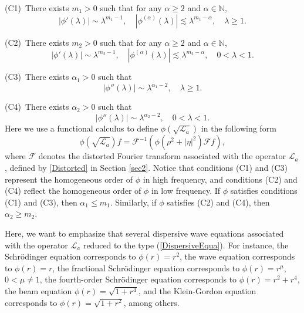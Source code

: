 \documentclass[a4paper,11pt, reqno]{amsart}
\numberwithin{equation}{section}
\theoremstyle{plain}
\theoremstyle{definition}
\theoremstyle{remark}
\begin{document}
(C1)~There exists $m_1>0$ such that for any $\alpha \geqslant 2$ and $\alpha \in \mathbb{N}$,
\begin{equation*}
|\phi'(\lambda)| \sim \lambda^{m_1-1}  , \quad |\phi^{(\alpha)}(\lambda)| \lesssim \lambda^{m_1-\alpha},\quad \lambda \geqslant 1.
\end{equation*}

(C2)~There exists $m_2>0$ such that for any $\alpha \geqslant 2$ and $\alpha \in \mathbb{N}$,
\begin{equation*}
|\phi'(\lambda)| \sim \lambda^{m_2-1}  , \quad |\phi^{(\alpha)}(\lambda)| \lesssim \lambda^{m_2-\alpha},\quad 0<\lambda<1.
\end{equation*}

(C3)~There exists $\alpha_1>0$ such that
\begin{equation*}
|\phi''(\lambda)| \sim \lambda^{\alpha_1-2}, \quad \lambda \geqslant1.
\end{equation*}

(C4)~There exists $\alpha_2>0$ such that
\begin{equation*}
|\phi''(\lambda)| \sim \lambda^{\alpha_2-2}, \quad  0<\lambda<1.
\end{equation*}
Here we use a functional calculus to define $\phi(\sqrt{\mathcal{L}_a}) $ in the following form $$\phi(\sqrt{\mathcal{L}_a})f=\mathcal{F}^{-1}\left(\phi(\rho^2+|\eta|^2) \mathcal{F} f\right), $$
where $\mathcal{F}$ denotes the distorted Fourier transform associated with the operator $\mathcal{L}_a$, defined by \eqref{Distorted} in Section \ref{sec2}.  Notice that conditions (C1) and (C3) represent the homogeneous order of $\phi$ in high frequency, and conditions (C2) and (C4) reflect the homogeneous order of $\phi$ in low frequency. If $\phi$ satisfies conditions (C1) and (C3), then $\alpha_1\leq m_1$. Similarly, if $\phi$ satisfies (C2) and (C4), then $\alpha_2\geq m_2$.

Here, we want to emphasize that several dispersive wave equations associated with the operator $\mathcal{L}_a$ reduced to the type (\ref{DispersiveEqua}). 
For instance, the Schr\"{o}dinger equation corresponds to $\phi(r)=r^2$, the wave equation corresponds to $\phi(r)=r$, the fractional Schr\"{o}dinger equation corresponds to $\phi(r)=r^\mu$, $0<\mu\neq 1$, the fourth-order Schr\"{o}dinger equation corresponds to $\phi(r)=r^2+r^4$, the beam equation $\phi(r)=\sqrt{1+r^4}$, and the Klein-Gordon equation corresponds to $\phi(r)=\sqrt{1+r^2}$, among others.  
 
\end{document}
